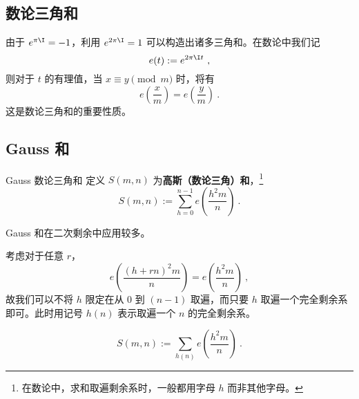 

\subsection{数论三角和}
由于 $e^{\pi \I} = -1$，利用 $e^{2\pi \I} = 1$ 可以构造出诸多三角和。在数论中我们记
\begin{equation}
e(t) := e^{2\pi \I t} ~,
\end{equation}
则对于 $t$ 的有理值，当 $x \equiv y \pmod m$ 时，将有
\begin{equation}
e\left(\frac{x}{m}\right) = e\left(\frac{y}{m}\right) ~.
\end{equation}
这是数论三角和的重要性质。

\subsection{Gauss 和}
\begin{definition}{Gauss 数论三角和}
定义 $S(m, n)$ 为\textbf{高斯（数论三角）和}，\footnote{在数论中，求和取遍剩余系时，一般都用字母 $h$ 而非其他字母。}
\begin{equation}
S(m, n) := \sum_{h = 0}^{n-1} e\left(\frac{h^2m}{n}\right) ~.
\end{equation}

\end{definition}
Gauss 和在二次剩余中应用较多。

考虑对于任意 $r$，
\begin{equation}
e\left(\frac{(h + rn)^2m}{n}\right) = e\left(\frac{h^2m}{n}\right) ~,
\end{equation}
故我们可以不将 $h$ 限定在从 $0$ 到 $(n-1)$ 取遍，而只要 $h$ 取遍一个完全剩余系即可。此时用记号 $h(n)$ 表示取遍一个 $n$ 的完全剩余系。
\begin{corollary}{}
\begin{equation}
S(m, n) := \sum_{h(n)} e\left(\frac{h^2 m}{n}\right) ~.
\end{equation}

\end{corollary}

